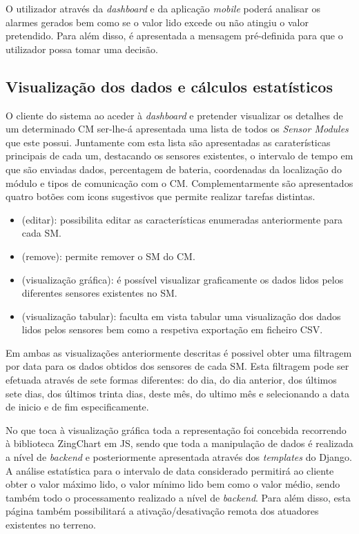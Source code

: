O utilizador através da \textit{dashboard} e da aplicação \textit{mobile} poderá analisar os alarmes gerados bem como se o valor lido excede ou não atingiu o valor pretendido. Para além disso, é apresentada a mensagem pré-definida para que o utilizador possa tomar uma decisão.   


\subsection{Visualização dos dados e cálculos estatísticos}

O cliente do sistema ao aceder à \textit{dashboard} e pretender visualizar os detalhes de um determinado \acl{CM} ser-lhe-á apresentada uma lista de todos os \textit{Sensor Modules} que este possui. Juntamente com esta lista são apresentadas as caraterísticas principais de cada um, destacando os sensores existentes, o intervalo de tempo em que são enviadas dados, percentagem de bateria, coordenadas da localização do módulo e tipos de comunicação com o \acl{CM}. Complementarmente são apresentados quatro botões com icons sugestivos que permite realizar tarefas distintas.  

\begin{itemize}
	\item \faEdit \space (editar): possibilita editar as características enumeradas anteriormente para cada \acl{SM}. 
	\item \faTrash \space (remove): permite remover o \acl{SM} do \ac{CM}. 
	\item \faBarChart \space (visualização gráfica): é possível visualizar graficamente os dados lidos pelos diferentes sensores existentes no \acl{SM}. 
	\item \faDatabase \space (visualização tabular): faculta em vista tabular uma visualização dos dados lidos pelos sensores bem como a respetiva exportação em ficheiro \ac{CSV}. 
\end{itemize}


Em ambas as visualizações anteriormente descritas é possivel obter uma filtragem por data para os dados obtidos dos sensores de cada \acl{SM}. Esta filtragem pode ser efetuada através de sete formas diferentes: do dia, do dia anterior, dos últimos sete dias, dos últimos trinta dias, deste mês, do ultimo mês e selecionando a data de inicio e de fim especificamente. 


No que toca à visualização gráfica toda a representação foi concebida recorrendo à biblioteca ZingChart em \ac{JS}, sendo que toda a manipulação de dados é realizada a nível de \textit{backend} e posteriormente apresentada através dos \textit{templates} do Django. A análise estatística para o intervalo de data considerado permitirá ao cliente obter o valor máximo lido, o valor mínimo lido bem como o valor médio, sendo também todo o processamento realizado a nível de \textit{backend}. Para além disso, esta página também possibilitará a ativação/desativação remota dos atuadores existentes no terreno. 


